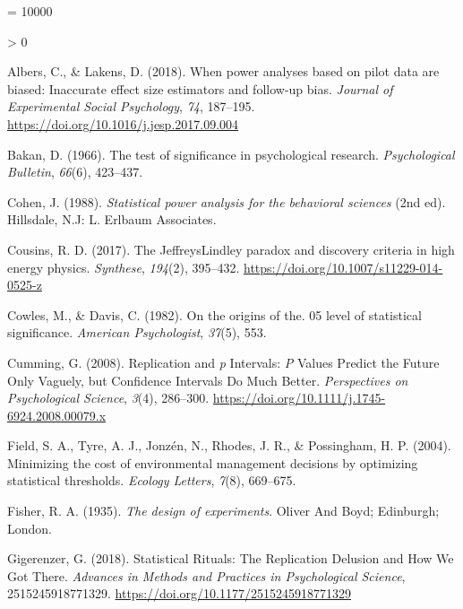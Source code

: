 \documentclass[
  english,
  ,jou, a4paper,floatsintext]{apa6}
\newlength{\cslhangindent}
\newenvironment{CSLReferences}[2] %
 {%
  \setlength{\parindent}{0pt}
  \ifodd #1 \everypar{\setlength{\hangindent}{\cslhangindent}}\ignorespaces\fi
  \ifnum #2 > 0
  \setlength{\parskip}{#2\baselineskip}
  \fi
 }%
 {}
\begin{document}
\begingroup

\interlinepenalty = 10000

\hypertarget{refs}{}
\begin{CSLReferences}{1}{0}
\leavevmode\hypertarget{ref-albers_when_2018}{}%
Albers, C., \& Lakens, D. (2018). When power analyses based on pilot data are biased: {Inaccurate} effect size estimators and follow-up bias. \emph{Journal of Experimental Social Psychology}, \emph{74}, 187--195. \url{https://doi.org/10.1016/j.jesp.2017.09.004}

\leavevmode\hypertarget{ref-bakan_test_1966}{}%
Bakan, D. (1966). The test of significance in psychological research. \emph{Psychological Bulletin}, \emph{66}(6), 423--437.

\leavevmode\hypertarget{ref-cohen_statistical_1988}{}%
Cohen, J. (1988). \emph{Statistical power analysis for the behavioral sciences} (2nd ed). {Hillsdale, N.J}: {L. Erlbaum Associates}.

\leavevmode\hypertarget{ref-cousins_jeffreyslindley_2017}{}%
Cousins, R. D. (2017). The {Jeffreys}{{Lindley}} paradox and discovery criteria in high energy physics. \emph{Synthese}, \emph{194}(2), 395--432. \url{https://doi.org/10.1007/s11229-014-0525-z}

\leavevmode\hypertarget{ref-cowles_origins_1982}{}%
Cowles, M., \& Davis, C. (1982). On the origins of the. 05 level of statistical significance. \emph{American Psychologist}, \emph{37}(5), 553.

\leavevmode\hypertarget{ref-cumming_replication_2008}{}%
Cumming, G. (2008). Replication and {\emph{p}} {Intervals}: {\emph{P}} {Values Predict} the {Future Only Vaguely}, but {Confidence Intervals Do Much Better}. \emph{Perspectives on Psychological Science}, \emph{3}(4), 286--300. \url{https://doi.org/10.1111/j.1745-6924.2008.00079.x}

\leavevmode\hypertarget{ref-field_minimizing_2004}{}%
Field, S. A., Tyre, A. J., Jonzén, N., Rhodes, J. R., \& Possingham, H. P. (2004). Minimizing the cost of environmental management decisions by optimizing statistical thresholds. \emph{Ecology Letters}, \emph{7}(8), 669--675.

\leavevmode\hypertarget{ref-fisher_design_1935}{}%
Fisher, R. A. (1935). \emph{The design of experiments}. {Oliver And Boyd; Edinburgh; London}.

\leavevmode\hypertarget{ref-gigerenzer_statistical_2018}{}%
Gigerenzer, G. (2018). Statistical {Rituals}: {The Replication Delusion} and {How We Got There}. \emph{Advances in Methods and Practices in Psychological Science}, 2515245918771329. \url{https://doi.org/10.1177/2515245918771329}


\end{CSLReferences}
\end{document}
